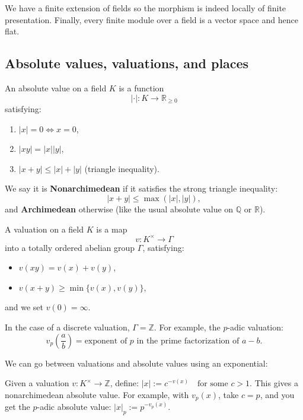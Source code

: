 \documentclass[12pt]{article}
\begin{document}
We have a finite extension of fields so the morphism is indeed locally of finite presentation. Finally, every finite module over a field is a vector space and hence flat.

\subsection{Absolute values, valuations, and places}

\begin{definition}
An absolute value on a field $K$ is a function
\[
|\cdot| : K \to \mathbb{R}_{\geq 0}
\]
satisfying:
\begin{enumerate}
    \item $|x| = 0 \iff x = 0$,
    \item $|xy| = |x||y|$,
    \item $|x + y| \leq |x| + |y|$ (triangle inequality).
\end{enumerate}

We say it is \textbf{Nonarchimedean} if it satisfies the strong triangle inequality:
    \[
    |x + y| \leq \max(|x|, |y|),
    \]
and \textbf{Archimedean} otherwise (like the usual absolute value on $\mathbb{Q}$ or $\mathbb{R}$).

\end{definition}


\begin{definition}
A valuation on a field $K$ is a map
\[
v: K^\times \to \Gamma
\]
into a totally ordered abelian group $\Gamma$, satisfying:
\begin{itemize}
    \item $v(xy) = v(x) + v(y)$,
    \item $v(x + y) \geq \min\{v(x), v(y)\}$,
\end{itemize}
and we set $v(0) = \infty$.

In the case of a discrete valuation, $\Gamma = \mathbb{Z}$. For example, the $p$-adic valuation:
\[
v_p\left( \frac{a}{b} \right) = \text{exponent of } p \text{ in the prime factorization of } a - b.
\]

\end{definition}
We can go between valuations and absolute values using an exponential:

Given a valuation $v: K^\times \to \mathbb{Z}$, define: $|x| := c^{-v(x)} \quad \text{for some } c > 1$. This gives a nonarchimedean absolute value. For example, with $v_p(x)$, take $c = p$, and you get the $p$-adic absolute value: $|x|_p := p^{-v_p(x)}$. 
\end{document}
